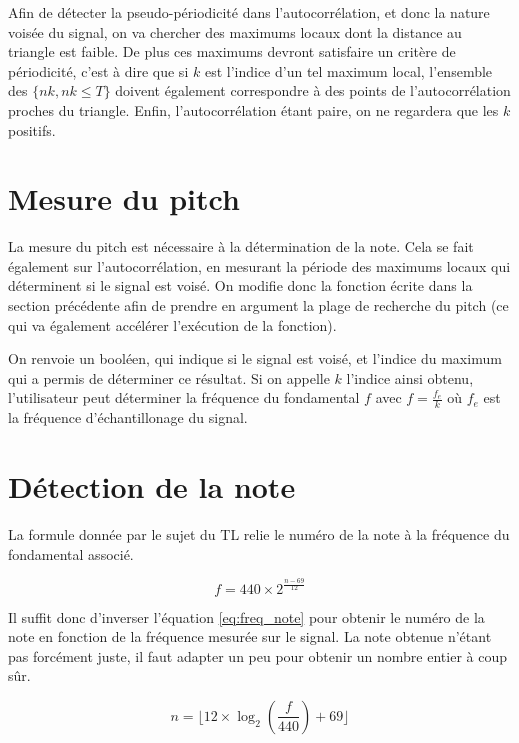 \documentclass[french]{article}
\begin{document}
Afin de détecter la pseudo-périodicité dans l'autocorrélation, et donc la nature voisée du signal, on va chercher des maximums locaux dont la distance au triangle est faible. De plus ces maximums devront satisfaire un critère de périodicité, c'est à dire que si $k$ est l'indice d'un tel maximum local, l'ensemble des $\{nk, nk \leq T\}$ doivent également correspondre à des points de l'autocorrélation proches du triangle. Enfin, l'autocorrélation étant paire, on ne regardera que les $k$ positifs.

\section{Mesure du pitch}

La mesure du pitch est nécessaire à la détermination de la note. Cela se fait également sur l'autocorrélation, en mesurant la période des maximums locaux qui déterminent si le signal est voisé. On modifie donc la fonction écrite dans la section précédente afin de prendre en argument la plage de recherche du pitch (ce qui va également accélérer l'exécution de la fonction). 

On renvoie un booléen, qui indique si le signal est voisé, et l'indice du maximum qui a permis de déterminer ce résultat. Si on appelle $k$ l'indice ainsi obtenu, l'utilisateur peut déterminer la fréquence du fondamental $f$ avec $f = \frac{f_e}{k}$ où $f_e$ est la fréquence d'échantillonage du signal.

\section{Détection de la note}

La formule donnée par le sujet du TL relie le numéro de la note à la fréquence du fondamental associé.

\begin{equation}
f = 440 \times 2 ^{\frac{n - 69}{12}}
\label{eq:freq_note}
\end{equation}

Il suffit donc d'inverser l'équation \ref{eq:freq_note} pour obtenir le numéro de la note en fonction de la fréquence mesurée sur le signal. La note obtenue n'étant pas forcément juste, il faut adapter un peu pour obtenir un nombre entier à coup sûr.

\begin{equation}
n = \lfloor 12 \times \log_2\left(\frac{f}{440}\right) + 69 \rfloor
\end{equation}
\end{document}
